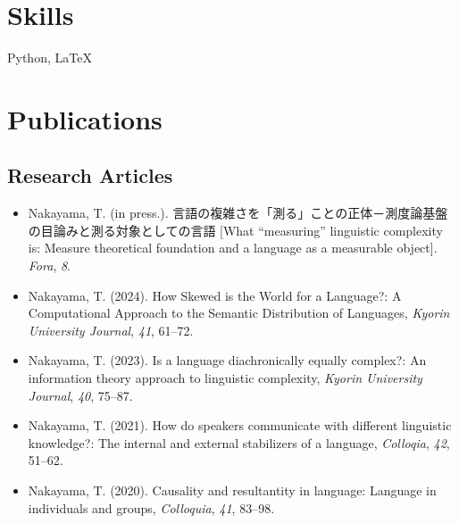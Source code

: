 \documentclass[a4paper,11pt]{article}
\begin{document}
\vspace{1em}

\section*{Skills}
  \hspace{0.5em} Python, \LaTeX

\vspace{1em}

\section*{Publications}
\subsection*{Research Articles}
\begin{itemize}[leftmargin=*, itemsep=0em, topsep=0em]
  \item Nakayama, T. (in press.). 言語の複雑さを「測る」ことの正体－測度論基盤の目論みと測る対象としての言語 [What ``measuring'' linguistic complexity is: Measure theoretical foundation and a language as a measurable object]. \textit{Fora}, \textit{8}. 
  \item  Nakayama, T. (2024). How Skewed is the World for a Language?: A Computational Approach to the Semantic Distribution of Languages, \textit{Kyorin University Journal}, \textit{41}, 61–72. 
  \item Nakayama, T. (2023). Is a language diachronically equally complex?: An information theory approach to linguistic complexity, \textit{Kyorin University Journal}, \textit{40}, 75–87. 
  \item Nakayama, T. (2021). How do speakers communicate with different linguistic knowledge?: The internal and external stabilizers of a language, \textit{Colloqia}, \textit{42}, 51–62.
  \item Nakayama, T. (2020). Causality and resultantity in language: Language in individuals and groups, \textit{Colloquia}, \textit{41}, 83–98.
\end{itemize}
\end{document}
